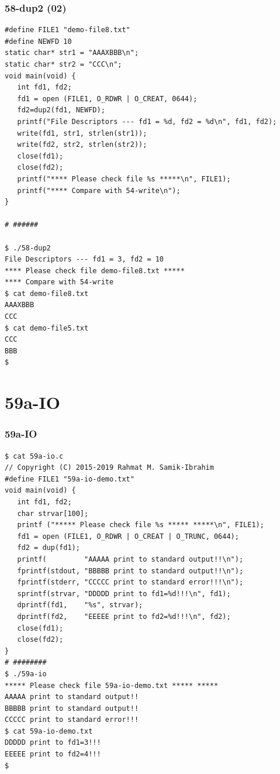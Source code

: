 \documentclass[aspectratio=169, xcolor=table, notheorems, hyperref={pdfpagelabels=false}]{beamer}
\begin{document}
\begin{frame}[fragile]
\frametitle{58-dup2 (02)}
\begin{lstlisting}[basicstyle=\ttfamily\tiny]
#define FILE1 "demo-file8.txt"
#define NEWFD 10
static char* str1 = "AAAXBBB\n";
static char* str2 = "CCC\n";
void main(void) {
   int fd1, fd2;
   fd1 = open (FILE1, O_RDWR | O_CREAT, 0644);
   fd2=dup2(fd1, NEWFD);
   printf("File Descriptors --- fd1 = %d, fd2 = %d\n", fd1, fd2);
   write(fd1, str1, strlen(str1));
   write(fd2, str2, strlen(str2));
   close(fd1);
   close(fd2);
   printf("**** Please check file %s *****\n", FILE1);
   printf("**** Compare with 54-write\n");
}

# ######

$ ./58-dup2 
File Descriptors --- fd1 = 3, fd2 = 10
**** Please check file demo-file8.txt *****
**** Compare with 54-write
$ cat demo-file8.txt 
AAAXBBB
CCC
$ cat demo-file5.txt 
CCC
BBB
$ 

\end{lstlisting}
\end{frame}

\section{59a-IO}
\begin{frame}[fragile]
\frametitle{59a-IO}
\begin{lstlisting}[basicstyle=\ttfamily\tiny]
$ cat 59a-io.c 
// Copyright (C) 2015-2019 Rahmat M. Samik-Ibrahim
#define FILE1 "59a-io-demo.txt"
void main(void) {
   int fd1, fd2;
   char strvar[100];
   printf ("***** Please check file %s ***** *****\n", FILE1);
   fd1 = open (FILE1, O_RDWR | O_CREAT | O_TRUNC, 0644);
   fd2 = dup(fd1);
   printf(         "AAAAA print to standard output!!\n"); 
   fprintf(stdout, "BBBBB print to standard output!!\n"); 
   fprintf(stderr, "CCCCC print to standard error!!!\n");
   sprintf(strvar, "DDDDD print to fd1=%d!!!\n", fd1);
   dprintf(fd1,    "%s", strvar);
   dprintf(fd2,    "EEEEE print to fd2=%d!!!\n", fd2);
   close(fd1);
   close(fd2);
}
# ########
$ ./59a-io 
***** Please check file 59a-io-demo.txt ***** *****
AAAAA print to standard output!!
BBBBB print to standard output!!
CCCCC print to standard error!!!
$ cat 59a-io-demo.txt 
DDDDD print to fd1=3!!!
EEEEE print to fd2=4!!!
$ 

\end{lstlisting}
\end{frame}
\end{document}

